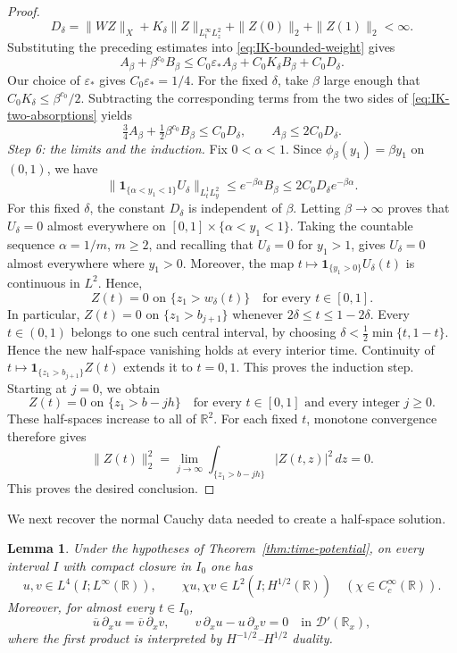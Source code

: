 \documentclass[11pt]{amsart}
\newtheorem{lemma}[theorem]{Lemma}
\theoremstyle{remark}
\newcommand{\R}{\mathbb R}
\newcommand{\D}{\mathcal D}
\newcommand{\1}{\mathbf 1}
\begin{document}
\begin{proof}
\[
 D_\delta=\|WZ\|_X+K_\delta\|Z\|_{L^\infty_tL^2_z}
          +\|Z(0)\|_2+\|Z(1)\|_2<\infty.
\]
Substituting the preceding estimates into
\eqref{eq:IK-bounded-weight} gives
\[
 A_\beta+\beta^{c_0}B_\beta
 \le C_0\varepsilon_*A_\beta+C_0K_\delta B_\beta+C_0D_\delta.
 \tag{1.4d}\label{eq:IK-two-absorptions}
\]
Our choice of $\varepsilon_*$ gives $C_0\varepsilon_*=1/4$.
For the fixed $\delta$, take $\beta$ large enough that
$C_0K_\delta\le\beta^{c_0}/2$.
Subtracting the corresponding terms from the two sides of
\eqref{eq:IK-two-absorptions} yields
\[
 \tfrac34 A_\beta+\tfrac12\beta^{c_0}B_\beta
 \le C_0D_\delta,
 \qquad
 A_\beta\le2C_0D_\delta.
 \tag{1.4e}\label{eq:IK-uniform-weighted-bound}
\]
\medskip
\noindent\emph{Step 6: the limits and the induction.}
Fix $0<\alpha<1$.  Since $\phi_\beta(y_1)=\beta y_1$ on $(0,1)$, we have
\[
 \|\1_{\{\alpha<y_1<1\}}U_\delta\|_{L^1_tL^2_y}
 \le e^{-\beta\alpha}B_\beta
 \le 2C_0D_\delta e^{-\beta\alpha}.
\]
For this fixed $\delta$, the constant $D_\delta$ is independent of $\beta$.
Letting $\beta\to\infty$ proves that $U_\delta=0$ almost everywhere on
$[0,1]\times\{\alpha<y_1<1\}$.  Taking the countable sequence
$\alpha=1/m$, $m\ge2$, and recalling that $U_\delta=0$ for $y_1>1$, gives
$U_\delta=0$ almost everywhere where $y_1>0$.
Moreover, the map
$t\mapsto\1_{\{y_1>0\}}U_\delta(t)$ is continuous in $L^2$. Hence,
\[
 Z(t)=0\text{ on }\{z_1>w_\delta(t)\}
 \quad\text{for every }t\in[0,1].
\]
In particular, $Z(t)=0$ on $\{z_1>b_{j+1}\}$ whenever
$2\delta\le t\le1-2\delta$.  Every $t\in(0,1)$ belongs to one such central
interval, by choosing $\delta<\frac12\min\{t,1-t\}$.
Hence the new half-space vanishing holds at every interior time.
Continuity of $t\mapsto\1_{\{z_1>b_{j+1}\}}Z(t)$ extends it to $t=0,1$. This proves the induction step.  Starting at $j=0$, we obtain
\[
 Z(t)=0\text{ on }\{z_1>b-jh\}
 \quad\text{for every }t\in[0,1]\text{ and every integer }j\ge0.
\]
These half-spaces increase to all of $\R^2$.  For each fixed $t$,
monotone convergence therefore gives
\[
 \|Z(t)\|_2^2
 =\lim_{j\to\infty}\int_{\{z_1>b-jh\}}|Z(t,z)|^2\,dz=0.
\]
This proves the desired conclusion.
\end{proof}

We next recover the normal Cauchy data needed to create a half-space solution.

\begin{lemma}
\label{lem:endpoint-wronskian}
Under the hypotheses of Theorem~\ref{thm:time-potential}, on every interval
$I$ with compact closure in $I_0$ one has
\[
 u,v\in L^4(I;L^\infty(\R)),
 \qquad
 \chi u,\chi v\in L^2(I;H^{1/2}(\R))
 \quad(\chi\in C_c^\infty(\R)).
 \tag{1.5}\label{eq:linear-endpoint-regularity}
\]
Moreover, for almost every $t\in I_0$,
\[
 \overline u\,\partial_xu=\overline v\,\partial_xv,
 \qquad
 v\,\partial_xu-u\,\partial_xv=0
 \quad\text{in }\D'(\R_x),
 \tag{1.6}\label{eq:current-wronskian}
\]
where the first product is interpreted by
$H^{-1/2}$--$H^{1/2}$ duality.
\end{lemma}
\end{document}
